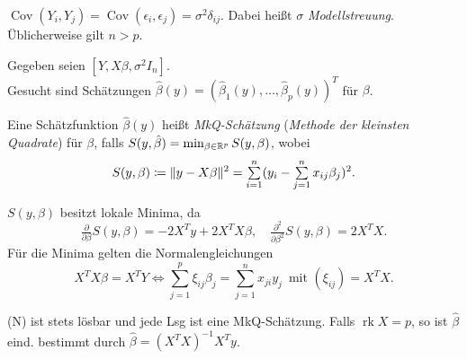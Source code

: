 \documentclass{cheat-sheet}
\DeclareMathOperator{\rk}{rk} %
\DeclareMathOperator{\cov}{Cov} %
\begin{document}
\begin{voraussetzung}
  $\cov(Y_i, Y_j) = \cov(\epsilon_i, \epsilon_j) = \sigma^2 \delta_{ij}$.
  Dabei heißt $\sigma$ \emph{Modellstreuung}.
  Üblicherweise gilt $n > p$.
\end{voraussetzung}



\begin{problem}
  Gegeben seien $[Y, X \beta, \sigma^2 I_n]$. \\
  Gesucht sind Schätzungen $\hat{\beta}(y) = (\hat{\beta}_1(y), \ldots, \hat{\beta}_p(y))^T$ für $\beta$.
\end{problem}

\begin{defn}
  Eine Schätzfunktion $\hat{\beta}(y)$ heißt \emph{MkQ-Schätzung} (\textit{Methode der kleinsten Quadrate}) für $\beta$, falls
  $S(y, \hat{\beta}) = \min_{\beta \in \mathbb{R}^p} S(y, \beta)$, wobei
  \[
    S(y, \beta) \coloneqq \norm{y - X \beta}^2 = \sum_{i=1}^n (y_i - \sum_{j=1}^n x_{ij} \beta_j)^2.
  \]
\end{defn}

\begin{bem}
  $S(y, \beta)$ besitzt lokale Minima, da
  \[
    \tfrac{\partial}{\partial \beta} S(y, \beta) = - 2 X^T y + 2 X^T X \beta, \quad
    \tfrac{\partial^2}{\partial \beta^2} S(y, \beta) = 2 X^T X.
  \]
  Für die Minima gelten die Normalengleichungen
  \[
    X^T X \beta = X^T Y \iff \sum_{j=1}^p \xi_{ij} \beta_j = \sum_{j=1}^n x_{ji} y_j \enspace
    \text{mit } (\xi_{ij}) = X^T X.
    \tag{N}
  \]
\end{bem}

\begin{satz}
  (N) ist stets lösbar und jede Lsg ist eine MkQ-Schätzung.
  Falls $\rk X = p$, so ist $\hat{\beta}$ eind. bestimmt durch $\hat{\beta} = (X^T X)^{-1} X^T y$.
\end{satz}
\end{document}
